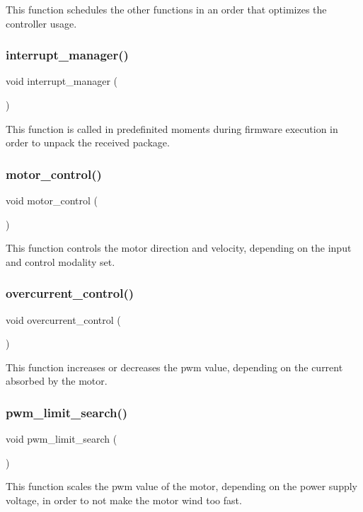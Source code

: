 This function schedules the other functions in an order that optimizes the controller usage. \mbox{\label{interruptions_8h_a9790811526002d99b25a814afd02cbae}} 
\subsubsection{interrupt\+\_\+manager()}
{\footnotesize\ttfamily void interrupt\+\_\+manager (\begin{DoxyParamCaption}{ }\end{DoxyParamCaption})}

This function is called in predefinited moments during firmware execution in order to unpack the received package. \mbox{\label{interruptions_8h_a8c7c487a5a127331b0de53443e3ca964}} 
\subsubsection{motor\+\_\+control()}
{\footnotesize\ttfamily void motor\+\_\+control (\begin{DoxyParamCaption}{ }\end{DoxyParamCaption})}

This function controls the motor direction and velocity, depending on the input and control modality set. \mbox{\label{interruptions_8h_a4e92908805632dc8cab2936d89bb3ba1}} 
\subsubsection{overcurrent\+\_\+control()}
{\footnotesize\ttfamily void overcurrent\+\_\+control (\begin{DoxyParamCaption}{ }\end{DoxyParamCaption})}

This function increases or decreases the pwm value, depending on the current absorbed by the motor. \mbox{\label{interruptions_8h_ab7b287cf5df2ea548297b951be2f20d4}} 
\subsubsection{pwm\+\_\+limit\+\_\+search()}
{\footnotesize\ttfamily void pwm\+\_\+limit\+\_\+search (\begin{DoxyParamCaption}{ }\end{DoxyParamCaption})}

This function scales the pwm value of the motor, depending on the power supply voltage, in order to not make the motor wind too fast. 